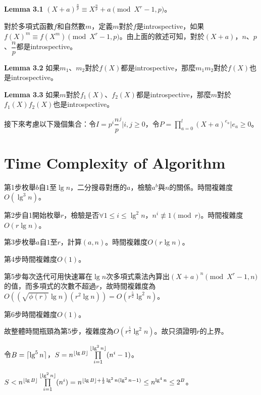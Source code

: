 \documentclass{article}
\DeclarePairedDelimiter\ceil{\lceil}{\rceil}
\DeclarePairedDelimiter\floor{\lfloor}{\rfloor}
\newcommand{\nequiv}{\not\equiv}
\begin{document}
\begin{mdframed}
\noindent\textbf{Lemma 3.1} $(X+a)^{\frac{n}{p}}\equiv X^{\frac{n}{p}}+a\pmod{X^r-1, p}$。
\end{mdframed}

    對於多項式函數$f$和自然數$m$，定義$m$對於$f$是introspective，如果$f(X)^m\equiv f(X^m)\pmod{X^r-1, p}$。由上面的敘述可知，對於$(X+a)$，$n$、$p$、$\dfrac{n}{p}$都是introspective。

\begin{mdframed}
\noindent\textbf{Lemma 3.2} 如果$m_1$、$m_2$對於$f(X)$都是introspective，那麼$m_1m_2$對於$f(X)$也是introspective。
\end{mdframed}

\begin{mdframed}
\noindent\textbf{Lemma 3.3} 如果$m$對於$f_1(X)$、$f_2(X)$都是introspective，那麼$m$對於$f_1(X)f_2(X)$也是introspective。
\end{mdframed}

    接下來考慮以下幾個集合：令$I={p^i\dfrac{n}{p}^j|i, j\geq 0}$，令$P={\prod\limits_{a=0}^{l}(X+a)^{e_a}|e_a\geq 0}$。

\section{Time Complexity of Algorithm}

    第1步枚舉$b$自$1$至$\lg n$，二分搜尋對應的$a$，檢驗$a^b$與$n$的關係。時間複雜度$O(\lg^3n)$。

    第2步自1開始枚舉$r$，檢驗是否$\forall 1\leq i\leq\lg^2n$，$n^i\nequiv 1\pmod{r}$。時間複雜度$O(r\lg n)$。

    第3步枚舉$a$自$1$至$r$，計算$(a,n)$。時間複雜度$O(r\lg n)$。

    第4步時間複雜度$O(1)$。

    第5步每次迭代可用快速冪在$\lg n$次多項式乘法內算出$(X+a)^n\pmod{X^r-1, n}$的值，而多項式的次數不超過$r$，故時間複雜度為$O((\sqrt{\phi(r)}\lg n)(r^2\lg n))=O(r^{\frac{5}{2}}\lg^2n)$。

    第6步時間複雜度$O(1)$。

    故整體時間瓶頸為第5步，複雜度為$O(r^{\frac{5}{2}}\lg^2n)$。故只須證明$r$的上界。

    令$B=\ceil{\lg^5n}$，$S=n^{\floor{\lg B}}\prod\limits_{i=1}^{\floor{\lg^2n}}(n^i-1)$。

    $S<n^{\floor{\lg B}}\prod\limits_{i=1}^{\floor{\lg^2n}}(n^i)=n^{\floor{\lg B}+\frac{1}{2}\lg^2n(\lg^2n-1)}\leq n^{\lg^4n}\leq 2^B$。
\end{document}
